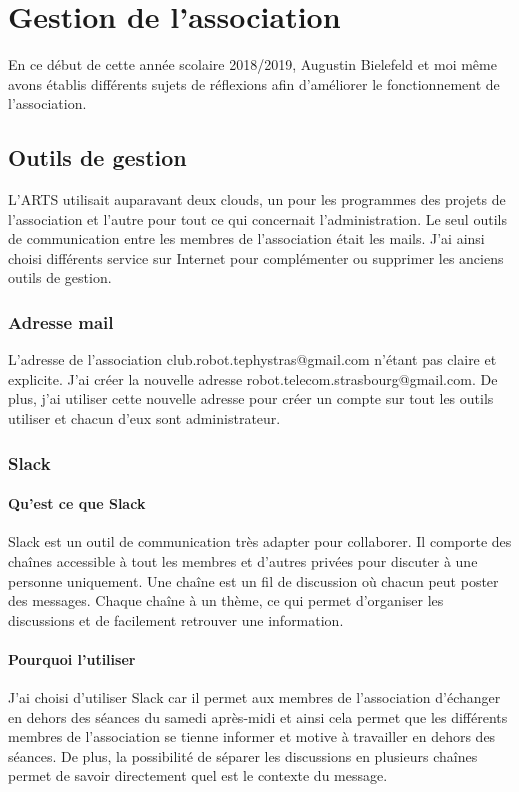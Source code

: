 \documentclass[11pt,a4paper]{report}
\begin{document}
\chapter{Gestion de l'association}
  En ce début de cette année scolaire 2018/2019, Augustin Bielefeld et moi même avons établis différents sujets de réflexions afin d'améliorer le fonctionnement de l'association.

  \section{Outils de gestion}
    L'ARTS utilisait auparavant deux clouds, un pour les programmes des projets de l'association et l'autre pour tout ce qui concernait l'administration.
    Le seul outils de communication entre les membres de l'association était les mails.
    J'ai ainsi choisi différents service sur Internet pour complémenter ou supprimer les anciens outils de gestion.

    \subsection{Adresse mail}
      L'adresse de l'association club.robot.tephystras@gmail.com n'étant pas claire et explicite. J'ai créer la nouvelle adresse robot.telecom.strasbourg@gmail.com.
      De plus, j'ai utiliser cette nouvelle adresse pour créer un compte sur tout les outils utiliser et chacun d'eux sont administrateur.

    \subsection{Slack}
      \subsubsection{Qu'est ce que Slack}
        Slack est un outil de communication très adapter pour collaborer. Il comporte des chaînes accessible à tout les membres et d'autres privées pour discuter à une personne uniquement. Une chaîne est un fil de discussion où chacun peut poster des messages. Chaque chaîne à un thème, ce qui permet d'organiser les discussions et de facilement retrouver une information.

      \subsubsection{Pourquoi l'utiliser}
        J'ai choisi d'utiliser Slack car il permet aux membres de l'association d'échanger en dehors des séances du samedi après-midi et ainsi cela permet que les différents membres de l'association se tienne informer et motive à travailler en dehors des séances. De plus, la possibilité de séparer les discussions en plusieurs chaînes permet de savoir directement quel est le contexte du message.
\end{document}
